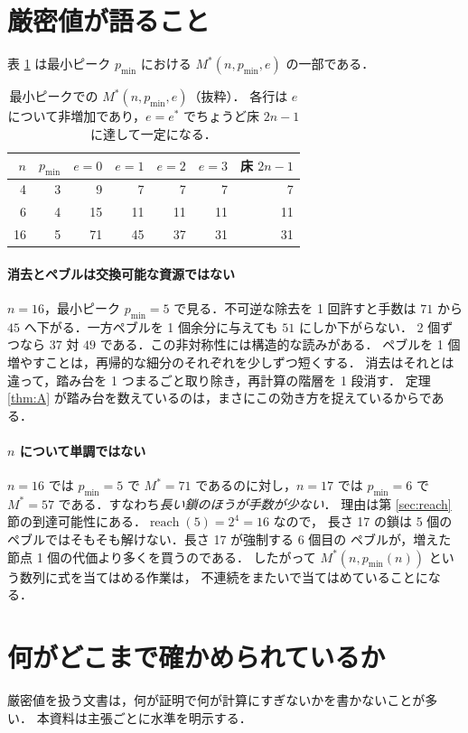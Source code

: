 \documentclass[a4paper,11pt]{jsarticle}
\theoremstyle{definition}
\newcommand{\Mstar}{M^{*}}
\newcommand{\estar}{e^{*}}
\newcommand{\reach}{\operatorname{reach}}
\begin{document}
\section{厳密値が語ること}\label{sec:values}
表 \ref{tab:surface} は最小ピーク $p_{\min}$ における $\Mstar(n,p_{\min},e)$ の一部である．

\begin{table}[tb]
\centering
\caption{最小ピークでの $\Mstar(n,p_{\min},e)$（抜粋）．
各行は $e$ について非増加であり，$e = \estar$ でちょうど床 $2n-1$ に達して一定になる．}
\label{tab:surface}
\small
\begin{tabular}{rrrrrrr}
\toprule
$n$ & $p_{\min}$ & $e=0$ & $e=1$ & $e=2$ & $e=3$ & 床 $2n-1$ \\
\midrule
4  & 3 & 9  & 7  & 7  & 7  & 7 \\
6  & 4 & 15 & 11 & 11 & 11 & 11 \\
16 & 5 & 71 & 45 & 37 & 31 & 31 \\
\bottomrule
\end{tabular}
\end{table}

\paragraph{消去とペブルは交換可能な資源ではない}
$n=16$，最小ピーク $p_{\min}=5$ で見る．不可逆な除去を 1 回許すと手数は
$71$ から $45$ へ下がる．一方ペブルを 1 個余分に与えても $51$ にしか下がらない．
2 個ずつなら $37$ 対 $49$ である．この非対称性には構造的な読みがある．
ペブルを 1 個増やすことは，再帰的な細分のそれぞれを少しずつ短くする．
消去はそれとは違って，踏み台を 1 つまるごと取り除き，再計算の階層を 1 段消す．
定理 \ref{thm:A} が踏み台を数えているのは，まさにこの効き方を捉えているからである．

\paragraph{$n$ について単調ではない}
$n=16$ では $p_{\min}=5$ で $\Mstar=71$ であるのに対し，$n=17$ では
$p_{\min}=6$ で $\Mstar=57$ である．すなわち\emph{長い鎖のほうが手数が少ない}．
理由は第 \ref{sec:reach} 節の到達可能性にある．$\reach(5)=2^4=16$ なので，
長さ 17 の鎖は 5 個のペブルではそもそも解けない．長さ 17 が強制する 6 個目の
ペブルが，増えた節点 1 個の代価より多くを買うのである．
したがって $\Mstar(n,p_{\min}(n))$ という数列に式を当てはめる作業は，
不連続をまたいで当てはめていることになる．

\section{何がどこまで確かめられているか}\label{sec:certified}
厳密値を扱う文書は，何が証明で何が計算にすぎないかを書かないことが多い．
本資料は主張ごとに水準を明示する．
\end{document}
